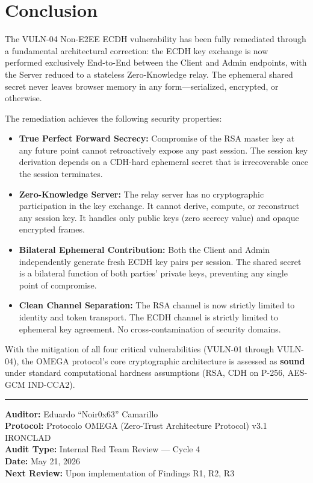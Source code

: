 \documentclass[12pt,a4paper]{article}
\begin{document}
\section{Conclusion}

The VULN-04 Non-E2EE ECDH vulnerability has been fully remediated through a fundamental architectural correction: the ECDH key exchange is now performed exclusively End-to-End between the Client and Admin endpoints, with the Server reduced to a stateless Zero-Knowledge relay. The ephemeral shared secret never leaves browser memory in any form---serialized, encrypted, or otherwise.

The remediation achieves the following security properties:

\begin{itemize}
    \item \textbf{True Perfect Forward Secrecy:} Compromise of the RSA master key at any future point cannot retroactively expose any past session. The session key derivation depends on a CDH-hard ephemeral secret that is irrecoverable once the session terminates.
    \item \textbf{Zero-Knowledge Server:} The relay server has no cryptographic participation in the key exchange. It cannot derive, compute, or reconstruct any session key. It handles only public keys (zero secrecy value) and opaque encrypted frames.
    \item \textbf{Bilateral Ephemeral Contribution:} Both the Client and Admin independently generate fresh ECDH key pairs per session. The shared secret is a bilateral function of both parties' private keys, preventing any single point of compromise.
    \item \textbf{Clean Channel Separation:} The RSA channel is now strictly limited to identity and token transport. The ECDH channel is strictly limited to ephemeral key agreement. No cross-contamination of security domains.
\end{itemize}

With the mitigation of all four critical vulnerabilities (VULN-01 through VULN-04), the OMEGA protocol's core cryptographic architecture is assessed as \textbf{sound} under standard computational hardness assumptions (RSA, CDH on P-256, AES-GCM IND-CCA2).

\vspace{2em}
\hrule
\vspace{1em}
\noindent\textbf{Auditor:} Eduardo ``Noir0x63'' Camarillo\\
\textbf{Protocol:} Protocolo OMEGA (Zero-Trust Architecture Protocol) v3.1 IRONCLAD\\
\textbf{Audit Type:} Internal Red Team Review --- Cycle 4\\
\textbf{Date:} May 21, 2026\\
\textbf{Next Review:} Upon implementation of Findings R1, R2, R3
\end{document}
